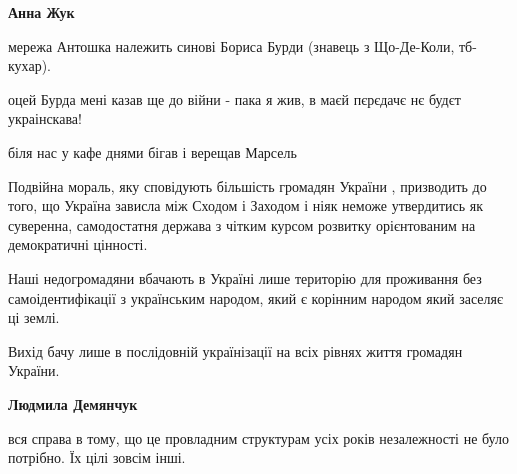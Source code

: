 \begin{itemize}
\begin{itemize}
 
\textbf{Анна Жук} 

мережа Антошка належить синові Бориса Бурди (знавець з Що-Де-Коли, тб-кухар).

оцей Бурда мені казав ще до війни - пака я жив, в маєй пєрєдачє нє будєт
украінскава!

\end{itemize}

 
біля нас у кафе днями бігав і верещав Марсель


Подвійна мораль, яку сповідують більшість громадян України , призводить до
того, що Україна зависла між Сходом і Заходом і ніяк неможе утвердитись як
суверенна, самодостатня держава з чітким курсом розвитку орієнтованим на
демократичні цінності.

Наші недогромадяни вбачають в Україні лише територію для проживання без
самоідентифікації з українським народом, який є корінним народом який заселяє
ці землі.

Вихід бачу лише в послідовній українізації на всіх рівнях життя громадян
України.

\begin{itemize}
 
\textbf{Людмила Демянчук} 

вся справа в тому, що це провладним структурам усіх років незалежності не було
потрібно. Їх цілі зовсім інші.


 

\end{itemize}
\end{itemize}
